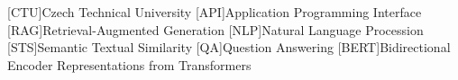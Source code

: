 
\begin{acronym}
  [CTU]{Czech Technical University}
  [API]{Application Programming Interface}
  [RAG]{Retrieval-Augmented Generation}
  [NLP]{Natural Language Procession}
  [STS]{Semantic Textual Similarity}
  [QA]{Question Answering}
  [BERT]{Bidirectional Encoder Representations from Transformers}
\end{acronym}
